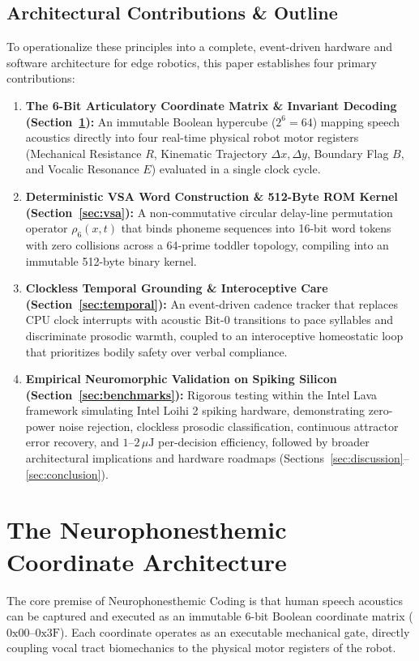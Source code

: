 \documentclass[journal,twocolumn]{IEEEtran}
\begin{document}
\subsection{Architectural Contributions \& Outline}
To operationalize these principles into a complete, event-driven hardware and software architecture for edge robotics, this paper establishes four primary contributions:
\begin{enumerate}
    \item \textbf{The 6-Bit Articulatory Coordinate Matrix \& Invariant Decoding (Section~\ref{sec:arch}):} An immutable Boolean hypercube ($2^6 = 64$) mapping speech acoustics directly into four real-time physical robot motor registers (Mechanical Resistance $R$, Kinematic Trajectory $\Delta x, \Delta y$, Boundary Flag $B$, and Vocalic Resonance $E$) evaluated in a single clock cycle.
    \item \textbf{Deterministic VSA Word Construction \& 512-Byte ROM Kernel (Section~\ref{sec:vsa}):} A non-commutative circular delay-line permutation operator $\rho_6(x, t)$ that binds phoneme sequences into 16-bit word tokens with zero collisions across a 64-prime toddler topology, compiling into an immutable 512-byte binary kernel.
    \item \textbf{Clockless Temporal Grounding \& Interoceptive Care (Section~\ref{sec:temporal}):} An event-driven cadence tracker that replaces CPU clock interrupts with acoustic Bit-0 transitions to pace syllables and discriminate prosodic warmth, coupled to an interoceptive homeostatic loop that prioritizes bodily safety over verbal compliance.
    \item \textbf{Empirical Neuromorphic Validation on Spiking Silicon (Section~\ref{sec:benchmarks}):} Rigorous testing within the Intel Lava framework simulating Intel Loihi 2 spiking hardware, demonstrating zero-power noise rejection, clockless prosodic classification, continuous attractor error recovery, and $1\text{--}2\,\mu\text{J}$ per-decision efficiency, followed by broader architectural implications and hardware roadmaps (Sections~\ref{sec:discussion}--\ref{sec:conclusion}).
\end{enumerate}

\section{The Neurophonesthemic Coordinate Architecture}
\label{sec:arch}

The core premise of Neurophonesthemic Coding is that human speech acoustics can be captured and executed as an immutable 6-bit Boolean coordinate matrix ($0\text{x}00\text{--}0\text{x}3\text{F}$). Each coordinate operates as an executable mechanical gate, directly coupling vocal tract biomechanics to the physical motor registers of the robot.
\end{document}
